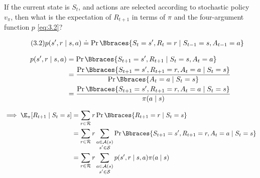 
\begin{exercise}[Exercise 3.11]

If the current state is $S_t$, and actions are selected according to stochastic policy $v_\pi$, then what is the expectation of $R_{t+1}$ in terms of $\pi$ and the four-argument function $p$ \eqref{eq:3.2}?

\end{exercise}


\begin{solution}

\begin{align} \label{eq:3.2} \tag{3.2}
    p(s^\prime, r \mid s, a)
    \doteq
    \Pr \Bbraces{S_t = s^\prime, R_t = r \mid S_{t-1} = s, A_{t-1} = a}
\end{align}
    
\begin{align*}
    p(s^\prime, r \mid s, a)
    & =
    \Pr \Bbraces{S_{t+1} = s^\prime, R_{t+1} \mid S_t = s, A_t = a} \\
    & =
    \frac
    {
        \Pr \Bbraces{S_{t+1} = s^\prime, R_{t+1} = r, A_t = a \mid S_t = s}
    }{
        \Pr \Bbraces{A_t = a \mid S_t = s}
    } \\
    & =
    \frac
    {
        \Pr \Bbraces{S_{t+1} = s^\prime, R_{t+1} = r, A_t = a \mid S_t = s}
    }{
        \pi(a \mid s)
    }
\end{align*}

\begin{align*}
    \implies
    \E_\pi[R_{t+1} \mid S_t = s]
    & =
    \sum_{r \in \mathcal R}
        r
        \Pr \Bbraces{R_{t+1} = r \mid S_t = s} \\
    & =
    \sum_{r \in \mathcal R}
        r
        \sum_{\substack{a \in \mathcal A(s) \\ s^\prime \in \mathcal S}}
            \Pr \Bbraces{S_{t+1} = s^\prime, R_{t+1} = r, A_t = a \mid S_t = s} \\
    & =
    \sum_{r \in \mathcal R}
        r
        \sum_{\substack{a \in \mathcal A(s) \\ s^\prime \in \mathcal S}}
            p(s^\prime, r \mid s, a) \pi(a \mid s)
\end{align*}

\end{solution}

